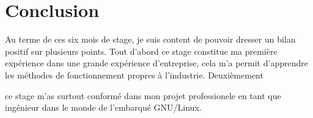 \chapter{Conclusion}
Au terme de ces six mois de stage, je suis content de pouvoir dresser un bilan positif sur plusieurs points. Tout d'abord ce stage constitue ma première expérience
dans une grande expérience d'entreprise, cela m'a permit d'apprendre les méthodes de fonctionnement propres à l'industrie. Deuxièmement

ce stage m'as surtout conformé dans mon projet professionele en tant que ingénieur dans le monde de l'embarqué GNU/Linux.